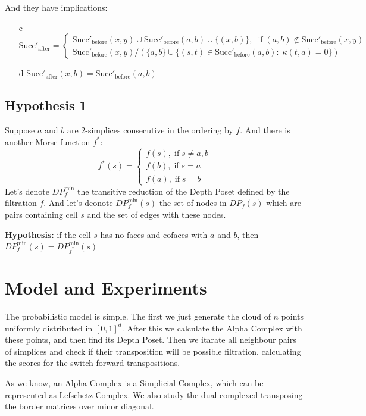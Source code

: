 \documentclass{article}
\begin{document}
And they have implications:

\begin{itemize}
\item[c] $
\text{Succ}'_\text{after} =
\begin{cases}
\text{Succ}'_\text{before}(x, y) \cup \text{Succ}'_\text{before}(a, b) \cup \{(x, b)\}, \;\; \text{if}\; (a, b)\notin \text{Succ}'_\text{before}(x, y) \\
\text{Succ}'_\text{before}(x, y) / (\{a, b\} \cup \{(s, t)\in \text{Succ}'_\text{before}(a, b):\; \kappa(t, a) = 0\})
\end{cases}
$
\item[d] $\text{Succ}'_\text{after}(x, b) = \text{Succ}'_\text{before}(a, b)$
\end{itemize}


\subsection{Hypothesis 1}
\par Suppose $a$ and $b$ are 2-simplices consecutive in the ordering by $f$. And there is another Morse function $f^*$:
$$
f^*(s) =
\begin{cases}
f(s), \; \text{if} \; s\ne a, b \\
f(b), \; \text{if} \; s = a \\
f(a), \; \text{if} \; s = b
\end{cases}
$$
Let's denote $DP_{f}^\text{min}$ the transitive reduction of the Depth Poset defined by the filtration $f$. And let's deonote $DP_{f}^\text{min}(s)$ the set of nodes in $DP_f(s)$ which are pairs containing cell $s$ and the set of edges with these nodes.

\par \textbf{Hypothesis:} if the cell $s$ has no faces and cofaces with $a$ and $b$, then $DP_f^\text{min}(s) = DP_{f^*}^\text{min}(s)$


\section{Model and Experiments}

\par The probabilistic model is simple. The first we just generate the cloud of $n$ points uniformly distributed in $[0, 1]^d$. After this we calculate the Alpha Complex with these points, and then find its Depth Poset. Then we itarate all neighbour pairs of simplices and check if their transposition will be possible filtration, calculating the scores for the switch-forward transpositions.
\par As we know, an Alpha Complex is a Simplicial Complex, which can be represented as Lefschetz Complex. We also study the dual complexed transposing the border matrices over minor diagonal.
\end{document}
